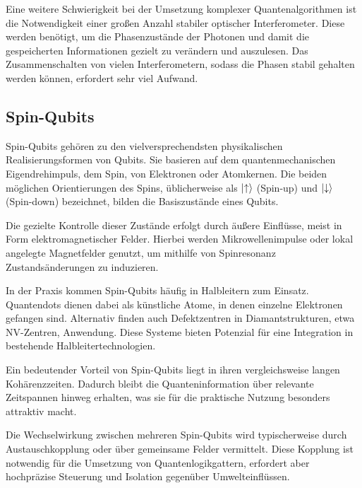 Eine weitere Schwierigkeit bei der Umsetzung komplexer Quantenalgorithmen ist die Notwendigkeit einer großen Anzahl stabiler optischer Interferometer. Diese werden benötigt, um die Phasenzustände der Photonen und damit die gespeicherten Informationen gezielt zu verändern und auszulesen. Das Zusammenschalten von vielen Interferometern, sodass die Phasen stabil gehalten werden können, erfordert sehr viel Aufwand. \\

\cite{nielsen_michael_a_and_isaac_l_chuang_quantum_2010}









\subsection{Spin-Qubits}
Spin-Qubits gehören zu den vielversprechendsten physikalischen Realisierungsformen von Qubits. Sie basieren auf dem quantenmechanischen Eigendrehimpuls, dem Spin, von Elektronen oder Atomkernen. Die beiden möglichen Orientierungen des Spins, üblicherweise als $\ket{\uparrow}$ (Spin-up) und $\ket{\downarrow}$ (Spin-down) bezeichnet, bilden die Basiszustände eines Qubits.

Die gezielte Kontrolle dieser Zustände erfolgt durch äußere Einflüsse, meist in Form elektromagnetischer Felder. Hierbei werden Mikrowellenimpulse oder lokal angelegte Magnetfelder genutzt, um mithilfe von Spinresonanz Zustandsänderungen zu induzieren.

In der Praxis kommen Spin-Qubits häufig in Halbleitern zum Einsatz. Quantendots dienen dabei als künstliche Atome, in denen einzelne Elektronen gefangen sind. Alternativ finden auch Defektzentren in Diamantstrukturen, etwa NV-Zentren, Anwendung. Diese Systeme bieten Potenzial für eine Integration in bestehende Halbleitertechnologien.

Ein bedeutender Vorteil von Spin-Qubits liegt in ihren vergleichsweise langen Kohärenzzeiten. Dadurch bleibt die Quanteninformation über relevante Zeitspannen hinweg erhalten, was sie für die praktische Nutzung besonders attraktiv macht.

Die Wechselwirkung zwischen mehreren Spin-Qubits wird typischerweise durch Austauschkopplung oder über gemeinsame Felder vermittelt. Diese Kopplung ist notwendig für die Umsetzung von Quantenlogikgattern, erfordert aber hochpräzise Steuerung und Isolation gegenüber Umwelteinflüssen.

